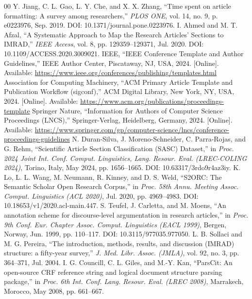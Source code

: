 \documentclass[conference]{IEEEtran}
\begin{document}
\begin{thebibliography}{00}
 Y. Jiang, C. L. Gao, L. Y. Che, and X. X. Zhang, ``Time spent on article formatting: A survey among researchers,'' \textit{PLOS ONE}, vol. 14, no. 9, p. e0223976, Sep. 2019. DOI: 10.1371/journal.pone.0223976.
 I. Ahmed and M. T. Afzal, ``A Systematic Approach to Map the Research Articles' Sections to IMRAD,'' \textit{IEEE Access}, vol. 8, pp. 129359--129371, Jul. 2020. DOI: 10.1109/ACCESS.2020.3009021.
 IEEE, ``IEEE Conference Template and Author Guidelines,'' IEEE Author Center, Piscataway, NJ, USA, 2024. [Online]. Available: \url{https://www.ieee.org/conferences/publishing/templates.html}
 Association for Computing Machinery, ``ACM Primary Article Template and Publication Workflow (sigconf),'' ACM Digital Library, New York, NY, USA, 2024. [Online]. Available: \url{https://www.acm.org/publications/proceedings-template}
 Springer Nature, ``Information for Authors of Computer Science Proceedings (LNCS),'' Springer-Verlag, Heidelberg, Germany, 2024. [Online]. Available: \url{https://www.springer.com/gp/computer-science/lncs/conference-proceedings-guidelines}
 N. Duran-Silva, J. Moreno-Schneider, C. Parra-Rojas, and G. Rehm, ``Scientific Article Section Classification (SASC) Dataset,'' in \textit{Proc. 2024 Joint Int. Conf. Comput. Linguistics, Lang. Resour. Eval. (LREC-COLING 2024)}, Torino, Italy, May 2024, pp. 1656--1665. DOI: 10.63317/3rdo9r4az3iy.
 K. Lo, L. L. Wang, M. Neumann, R. Kinney, and D. S. Weld, ``S2ORC: The Semantic Scholar Open Research Corpus,'' in \textit{Proc. 58th Annu. Meeting Assoc. Comput. Linguistics (ACL 2020)}, Jul. 2020, pp. 4969--4983. DOI: 10.18653/v1/2020.acl-main.447.
 S. Teufel, J. Carletta, and M. Moens, ``An annotation scheme for discourse-level argumentation in research articles,'' in \textit{Proc. 9th Conf. Eur. Chapter Assoc. Comput. Linguistics (EACL 1999)}, Bergen, Norway, Jun. 1999, pp. 110--117. DOI: 10.3115/977035.977050.
 L. B. Sollaci and M. G. Pereira, ``The introduction, methods, results, and discussion (IMRAD) structure: a fifty-year survey,'' \textit{J. Med. Libr. Assoc. (JMLA)}, vol. 92, no. 3, pp. 364--371, Jul. 2004.
 I. G. Councill, C. L. Giles, and M.-Y. Kan, ``ParsCit: An open-source CRF reference string and logical document structure parsing package,'' in \textit{Proc. 6th Int. Conf. Lang. Resour. Eval. (LREC 2008)}, Marrakech, Morocco, May 2008, pp. 661--667.

\end{thebibliography}
\end{document}
